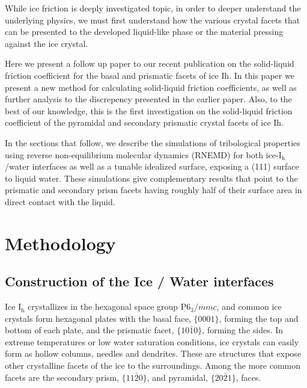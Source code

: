 \documentclass[aps,jcp,preprint,showpacs,superscriptaddress,groupedaddress]{revtex4}  %
\begin{document}
While ice friction is deeply investigated topic, in order to deeper understand
the underlying physics, we must first understand how the various crystal facets
that can be presented to the developed liquid-like phase or the material
pressing against the ice crystal.

Here we present a follow up paper to our recent publication on the solid-liquid
friction coefficient for the basal and prismatic facets of ice Ih. In this 
paper we present a new method for calculating solid-liquid friction 
coefficients, as well as further analysis to the discrepency presented in the 
earlier paper. Also, to the best of our knowledge, this is the first 
investigation on the solid-liquid friction coefficient of the pyramidal and 
secondary prismatic crystal facets of ice Ih. 

In the sections that follow, we describe the simulations of
tribological properties using reverse non-equilibrium molecular dynamics 
(RNEMD) for both ice-I$_\mathrm{h}$/water interfaces as well as a tunable
idealized surface, exposing a (111) surface to liquid water.  
These simulations give complementary results that point to the prismatic and 
secondary prism facets having roughly half of their surface area in direct 
contact with the liquid.

\section{Methodology}
\subsection{Construction of the Ice / Water interfaces}
Ice I$_\mathrm{h}$ crystallizes in the hexagonal space group
P$6_3/mmc$, and common ice crystals form hexagonal plates with the
basal face, $\{0001\}$, forming the top and bottom of each plate, and
the prismatic facet, $\{10\bar{1}0\}$, forming the sides.  In extreme
temperatures or low water saturation conditions, ice crystals can
easily form as hollow columns, needles and dendrites. These are
structures that expose other crystalline facets of the ice to the
surroundings.  Among the more common facets are the secondary prism,
$\{11\bar{2}0\}$, and pyramidal, $\{20\bar{2}1\}$, faces.  
\end{document}

